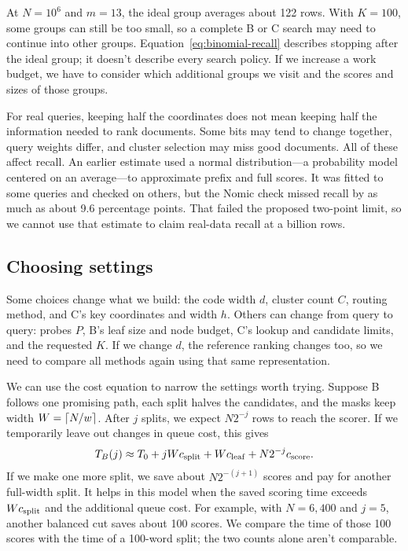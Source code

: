
At $N=10^6$ and $m=13$, the ideal group averages about 122 rows. With $K=100$, some groups
can still be too small, so a complete B or C search may need to continue into other groups.
Equation~\ref{eq:binomial-recall} describes stopping after the ideal group; it doesn't describe
every search policy. If we increase a work budget, we have to consider which additional groups
we visit and the scores and sizes of those groups.

For real queries, keeping half the coordinates does not mean keeping half the information
needed to rank documents. Some bits may tend to change together, query weights differ, and
cluster selection may miss good documents. All of these affect recall. An earlier estimate
used a normal distribution---a probability model centered on an average---to approximate
prefix and full scores. It was fitted to some
queries and checked on others, but the Nomic check missed recall by as much as about 9.6
percentage points. That failed the proposed two-point limit, so we cannot use that estimate
to claim real-data recall at a billion rows.

\subsection{Choosing settings}
Some choices change what we build: the code width $d$, cluster count $C$, routing method,
and C's key coordinates and width $h$. Others can change from query to query: probes $P$,
B's leaf size and node budget, C's lookup and candidate limits, and the requested $K$. If
we change $d$, the reference ranking changes too, so we need to compare all methods again
using that same representation.

We can use the cost equation to narrow the settings worth trying. Suppose B follows one
promising path, each split halves the candidates, and the masks keep width $W=\left\lceil N/w\right\rceil$.
After $j$ splits, we expect $N2^{-j}$ rows to reach the scorer. If we temporarily leave out
changes in queue cost, this gives
\begin{equation}
T_B(j)\approx T_0+jWc_{\rm split}+Wc_{\rm leaf}+N2^{-j}c_{\rm score}.
\label{eq:depth}
\end{equation}
If we make one more split, we save about $N2^{-(j+1)}$ scores and pay for another full-width
split. It helps in this model when the saved scoring time exceeds $Wc_{\rm split}$ and the
additional queue cost. For example, with $N=6{,}400$ and $j=5$, another balanced cut saves
about 100 scores. We compare the time of those 100 scores with the time of a 100-word split;
the two counts alone aren't comparable.

